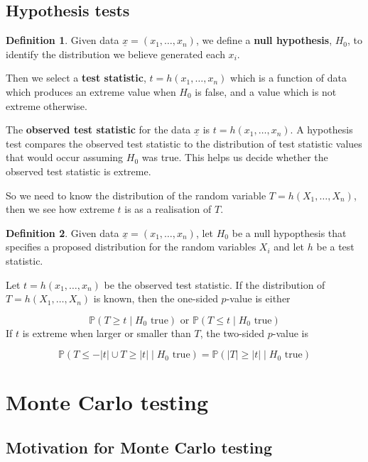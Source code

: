 \documentclass[12pt,a4paper]{article}
\theoremstyle{definition}
\newtheorem{definition}{Definition}[subsection]
\begin{document}
\subsection{Hypothesis tests}

\begin{definition}
	Given data $\underline{x} = (x_1, \dots, x_n)$, we define a \textbf{null hypothesis}, $H_0$, to identify the distribution we believe generated each $x_i$.

	Then we select a \textbf{test statistic}, $t = h(x_1, \dots, x_n)$ which is a function of data which produces an extreme value when $H_0$ is false, and a value which is not extreme otherwise.

	The \textbf{observed test statistic} for the data $\underline{x}$ is $t = h(x_1, \dots, x_n)$. A hypothesis test compares the observed test statistic to the distribution of test statistic values that would occur assuming $H_0$ was true. This helps us decide whether the observed test statistic is extreme.

	So we need to know the distribution of the random variable $T = h(X_1, \dots, X_n)$, then we see how extreme $t$ is as a realisation of $T$.
\end{definition}

\begin{definition}
	Given data $\underline{x} = (x_1, \dots, x_n)$, let $H_0$ be a null hypopthesis that specifies a proposed distribution for the random variables $X_i$ and let $h$ be a test statistic.

	Let $t = h(x_1, \dots, x_n)$ be the observed test statistic. If the distribution of $T = h(X_1, \dots, X_n)$ is known, then the one-sided $p$-value is either

	\[ \mathbb{P}(T \ge t \mid H_0 \text{ true}) \text{ \ or \ } \mathbb{P}(T \le t \mid H_0 \text{ true}) \]
	If $t$ is extreme when larger or smaller than $T$, the two-sided $p$-value is

	\[ \mathbb{P}(T \le -|t| \cup T \ge |t| \mid H_0 \text{ true} ) = \mathbb{P}(|T| \ge |t| \mid H_0 \text{ true}) \]
\end{definition}

\section{Monte Carlo testing}

\subsection{Motivation for Monte Carlo testing}
\end{document}
